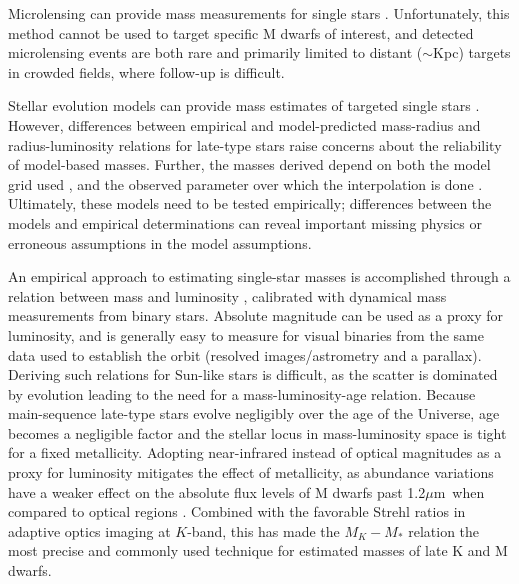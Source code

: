 \documentclass[twocolumn]{aastex62}
\newcommand{\um}{$\mu$m}
\begin{document}
Microlensing can provide mass measurements for single stars \citep[e.g.,][]{2016ApJ...825...60Z,2017ApJ...838..154C,2017AJ....154..176S}. Unfortunately, this method cannot be used to target specific M dwarfs of interest, and detected microlensing events are both rare and primarily limited to distant ($\sim$Kpc) targets in crowded fields, where follow-up is difficult. 

Stellar evolution models can provide mass estimates of targeted single stars \citep[e.g.,][]{Muirhead2012a}. However, differences between empirical and model-predicted mass-radius and radius-luminosity relations for late-type stars \citep[e.g.,][]{Boyajian2012,Feiden2012a} raise concerns about the reliability of model-based masses. Further, the masses derived depend on both the model grid used \citep{Spada2013,MIST1}, and the observed parameter over which the interpolation is done \citep[e.g., color versus luminosity,][]{Mann:2012,Mann2015b}. Ultimately, these models need to be tested empirically; differences between the models and empirical determinations can reveal important missing physics or erroneous assumptions in the model assumptions. 

An empirical approach to estimating single-star masses is accomplished through a relation between mass and luminosity \citep[e.g.,][]{Hen1993, Delfosse2000}, calibrated with dynamical mass measurements from binary stars. Absolute magnitude can be used as a proxy for luminosity, and is generally easy to measure for visual binaries from the same data used to establish the orbit (resolved images/astrometry and a parallax). Deriving such relations for Sun-like stars is difficult, as the scatter is dominated by evolution \citep[e.g.,][]{1991A&ARv...3...91A,2010A&ARv..18...67T} leading to the need for a mass-luminosity-age relation. Because main-sequence late-type stars evolve negligibly over the age of the Universe, age becomes a negligible factor and the stellar locus in mass-luminosity space is tight for a fixed metallicity. Adopting near-infrared instead of optical magnitudes as a proxy for luminosity mitigates the effect of metallicity, as abundance variations have a weaker effect on the absolute flux levels of M dwarfs past 1.2\um\ when compared to optical regions \citep{Delfosse2000,Bonfils:2005}. Combined with the favorable Strehl ratios in adaptive optics imaging at $K$-band, this has made the $M_K-M_*$ relation the most precise and commonly used technique for estimated masses of late K and M dwarfs. 
\end{document}
